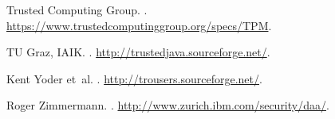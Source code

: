 \documentclass[runningheads]{llncs}
\begin{document}
\begin{thebibliography}{10}
{Trusted Computing Group}.
.
\newblock \newline\url{https://www.trustedcomputinggroup.org/specs/TPM}.

{TU Graz, IAIK}.
.
\newblock \newline\url{http://trustedjava.sourceforge.net/}.

Kent Yoder et~al.
.
\newblock \newline\url{http://trousers.sourceforge.net/}.

Roger Zimmermann.
.
\newblock
  \newline\url{http://www.zurich.ibm.com/security/daa/}.

\end{thebibliography}
\end{document}
